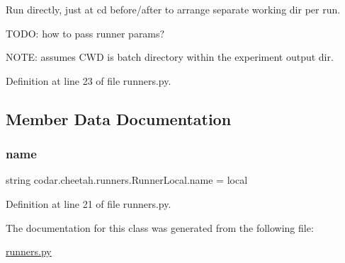\begin{DoxyVerb}Run directly, just at cd before/after to arrange separate working
dir per run.

TODO: how to pass runner params?

NOTE: assumes CWD is batch directory within the experiment output dir.
\end{DoxyVerb}
 

Definition at line 23 of file runners.\+py.



\subsection{Member Data Documentation}
\mbox{\label{classcodar_1_1cheetah_1_1runners_1_1_runner_local_a0456010ad8c87331e23127a490227bf1}} 
\subsubsection{\texorpdfstring{name}{name}}
{\footnotesize\ttfamily string codar.\+cheetah.\+runners.\+Runner\+Local.\+name = \textquotesingle{}local\textquotesingle{}\hspace{0.3cm}{\ttfamily [static]}}



Definition at line 21 of file runners.\+py.



The documentation for this class was generated from the following file\+:\begin{DoxyCompactItemize}
\item 
\hyperlink{runners_8py}{runners.\+py}\end{DoxyCompactItemize}
